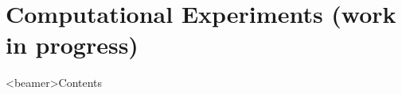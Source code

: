 \documentclass{beamer}
\newcommand{\julia}{\texttt{Julia}}
\begin{document}

\section{Computational Experiments (work in progress)}
\begin{frame}<beamer>{Contents}
\end{frame}	
\end{document}
